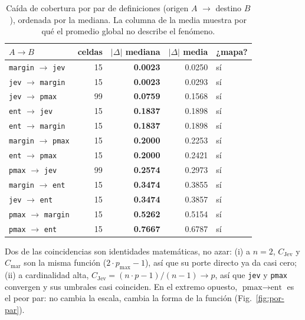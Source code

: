 \begin{table}[t]
\centering
\caption{Caída de cobertura por par de definiciones (origen $A$ $\to$ destino $B$), ordenada por la mediana. La
columna de la media muestra por qué el promedio global no describe el fenómeno.}
\label{tab:par}
{\footnotesize
\setlength{\tabcolsep}{3pt}
\begin{tabular}{lrrrl}
\toprule
$A \to B$ & celdas & $\lvert\Delta\rvert$ mediana & $\lvert\Delta\rvert$ media & ¿mapa? \\
\midrule
\texttt{margin} $\to$ \texttt{jev} & 15 & \textbf{0.0023} & 0.0250 & sí \\
\texttt{jev} $\to$ \texttt{margin} & 15 & \textbf{0.0023} & 0.0293 & sí \\
\texttt{jev} $\to$ \texttt{pmax} & 99 & \textbf{0.0759} & 0.1568 & sí \\
\texttt{ent} $\to$ \texttt{jev} & 15 & \textbf{0.1837} & 0.1898 & sí \\
\texttt{ent} $\to$ \texttt{margin} & 15 & \textbf{0.1837} & 0.1898 & sí \\
\texttt{margin} $\to$ \texttt{pmax} & 15 & \textbf{0.2000} & 0.2253 & sí \\
\texttt{ent} $\to$ \texttt{pmax} & 15 & \textbf{0.2000} & 0.2421 & sí \\
\texttt{pmax} $\to$ \texttt{jev} & 99 & \textbf{0.2574} & 0.2973 & sí \\
\texttt{margin} $\to$ \texttt{ent} & 15 & \textbf{0.3474} & 0.3855 & sí \\
\texttt{jev} $\to$ \texttt{ent} & 15 & \textbf{0.3474} & 0.3857 & sí \\
\texttt{pmax} $\to$ \texttt{margin} & 15 & \textbf{0.5262} & 0.5154 & sí \\
\texttt{pmax} $\to$ \texttt{ent} & 15 & \textbf{0.7667} & 0.6787 & sí \\
\bottomrule
\end{tabular}}
\end{table}

Dos de las coincidencias son identidades matemáticas, no azar: (i) a $n = 2$, $C_{\text{Jev}}$ y
$C_{\text{mar}}$ son la misma función ($2\cdot p_{\max} - 1$), así que su porte directo ya da casi
cero; (ii) a cardinalidad alta, $C_{\text{Jev}} = (n\cdot p - 1)/(n - 1) \to p$, así que \texttt{jev} y
\texttt{pmax} convergen y sus umbrales casi coinciden. En el extremo opuesto,
$\text{pmax} \to \text{ent}$ es el peor par: no cambia la escala, cambia la forma de la función (Fig.~\ref{fig:por-par}).

